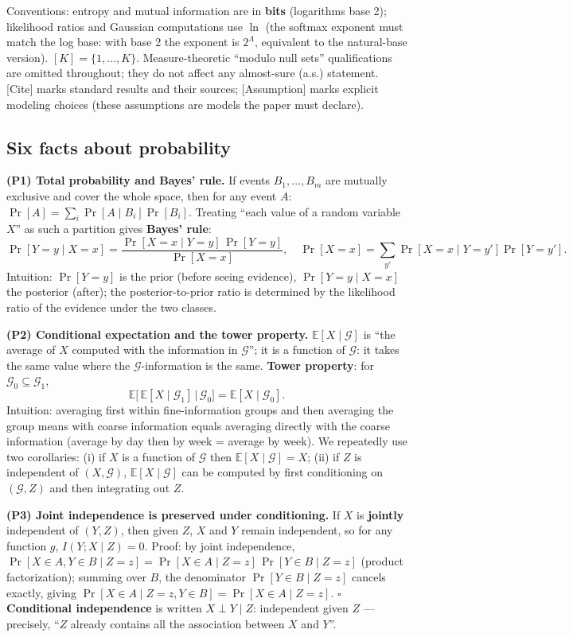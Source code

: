 \documentclass{article}
\providecommand{\qed}{\hfill$\square$}
\begin{document}
Conventions: entropy and mutual information are in \textbf{bits} (logarithms base 2); likelihood ratios and Gaussian computations use $\ln$ (the softmax exponent must match the log base: with base 2 the exponent is $2^{\Lambda}$, equivalent to the natural-base version). $[K]=\{1,\dots,K\}$. Measure-theoretic ``modulo null sets'' qualifications are omitted throughout; they do not affect any almost-sure (a.s.) statement. [Cite] marks standard results and their sources; [Assumption] marks explicit modeling choices (these assumptions are models the paper must declare).

\subsection{Six facts about probability}

\textbf{(P1) Total probability and Bayes' rule.} If events $B_1,\dots,B_m$ are mutually exclusive and cover the whole space, then for any event $A$: $\Pr[A]=\sum_i\Pr[A\mid B_i]\Pr[B_i]$. Treating ``each value of a random variable $X$'' as such a partition gives \textbf{Bayes' rule}:
\[
\Pr[Y{=}y\mid X{=}x]=\frac{\Pr[X{=}x\mid Y{=}y]\,\Pr[Y{=}y]}{\Pr[X{=}x]},\quad \Pr[X{=}x]=\sum_{y'}\Pr[X{=}x\mid Y{=}y']\Pr[Y{=}y'].
\]
Intuition: $\Pr[Y{=}y]$ is the prior (before seeing evidence), $\Pr[Y{=}y\mid X{=}x]$ the posterior (after); the posterior-to-prior ratio is determined by the likelihood ratio of the evidence under the two classes.

\textbf{(P2) Conditional expectation and the tower property.} $\mathbb E[X\mid\mathcal G]$ is ``the average of $X$ computed with the information in $\mathcal G$''; it is a function of $\mathcal G$: it takes the same value where the $\mathcal G$-information is the same. \textbf{Tower property}: for $\mathcal G_0\subseteq\mathcal G_1$,
\[
\mathbb E\big[\,\mathbb E[X\mid\mathcal G_1]\,\big|\,\mathcal G_0\big]=\mathbb E[X\mid\mathcal G_0].
\]
Intuition: averaging first within fine-information groups and then averaging the group means with coarse information equals averaging directly with the coarse information (average by day then by week = average by week). We repeatedly use two corollaries: (i) if $X$ is a function of $\mathcal G$ then $\mathbb E[X\mid\mathcal G]=X$; (ii) if $Z$ is independent of $(X,\mathcal G)$, $\mathbb E[X\mid\mathcal G]$ can be computed by first conditioning on $(\mathcal G,Z)$ and then integrating out $Z$.

\textbf{(P3) Joint independence is preserved under conditioning.} If $X$ is \textbf{jointly} independent of $(Y,Z)$, then given $Z$, $X$ and $Y$ remain independent, so for any function $g$, $I(Y;X\mid Z)=0$. Proof: by joint independence, $\Pr[X{\in}A,Y{\in}B\mid Z{=}z]=\Pr[X{\in}A\mid Z{=}z]\,\Pr[Y{\in}B\mid Z{=}z]$ (product factorization); summing over $B$, the denominator $\Pr[Y{\in}B\mid Z{=}z]$ cancels exactly, giving $\Pr[X{\in}A\mid Z{=}z,Y{\in}B]=\Pr[X{\in}A\mid Z{=}z]$. \qed{} \textbf{Conditional independence} is written $X\perp Y\mid Z$: independent given $Z$ --- precisely, ``$Z$ already contains all the association between $X$ and $Y$''.
\end{document}
